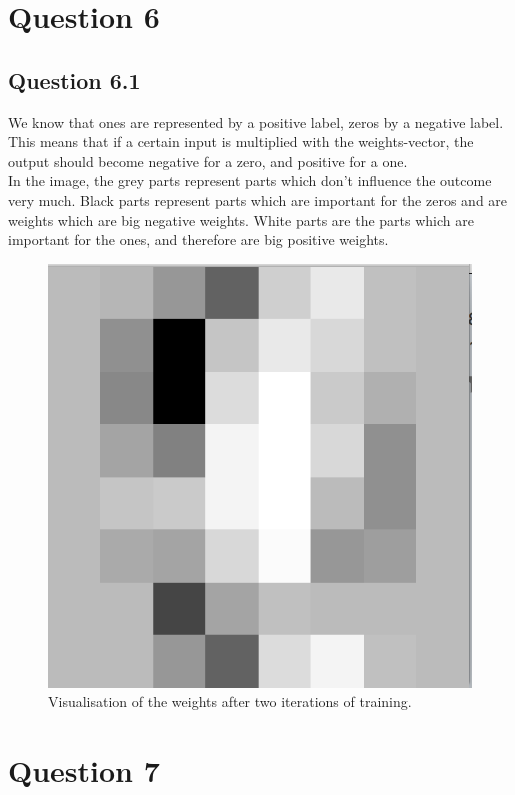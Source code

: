\documentclass[11pt,twoside,a4paper]{article}
\begin{document}
\section{Question 6}

	\subsection{Question 6.1}
	We know that ones are represented by a positive label, zeros by a negative label. This means that if a certain input is multiplied with the weights-vector, the output should become negative for a zero, and positive for a one. \\
	In the image, the grey parts represent parts which don't influence the outcome very much. Black parts represent parts which are important for the zeros and are weights which are big negative weights. White parts are the parts which are important for the ones, and therefore are big positive weights. 
	
\begin{figure}[ht]
    \centering
    \includegraphics[scale=0.5]{digits_weights.png}
    \caption{Visualisation of the weights after two iterations of training.}
\end{figure}	
	
\section{Question 7}
\end{document}
